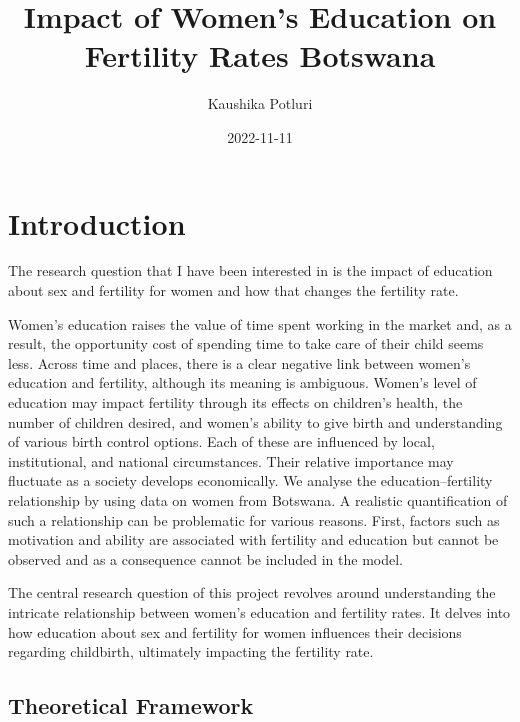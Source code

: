 \documentclass[
  letterpaper,
  DIV=11,
  numbers=noendperiod]{scrartcl}
\title{Impact of Women's Education on Fertility Rates Botswana}
\author{Kaushika Potluri}
\date{2022-11-11}
\begin{document}
\maketitle
\ifdefined\Shaded\renewenvironment{Shaded}{\begin{tcolorbox}[enhanced, frame hidden, breakable, borderline west={3pt}{0pt}{shadecolor}, interior hidden, boxrule=0pt, sharp corners]}{\end{tcolorbox}}\fi

\hypertarget{introduction}{%
\section{Introduction}\label{introduction}}

The research question that I have been interested in is the impact of
education about sex and fertility for women and how that changes the
fertility rate.

Women's education raises the value of time spent working in the market
and, as a result, the opportunity cost of spending time to take care of
their child seems less. Across time and places, there is a clear
negative link between women's education and fertility, although its
meaning is ambiguous. Women's level of education may impact fertility
through its effects on children's health, the number of children
desired, and women's ability to give birth and understanding of various
birth control options. Each of these are influenced by local,
institutional, and national circumstances. Their relative importance may
fluctuate as a society develops economically. We analyse the
education--fertility relationship by using data on women from Botswana.
A realistic quantification of such a relationship can be problematic for
various reasons. First, factors such as motivation and ability are
associated with fertility and education but cannot be observed and as a
consequence cannot be included in the model.

The central research question of this project revolves around
understanding the intricate relationship between women's education and
fertility rates. It delves into how education about sex and fertility
for women influences their decisions regarding childbirth, ultimately
impacting the fertility rate.

\hypertarget{theoretical-framework}{%
\subsection{Theoretical Framework}\label{theoretical-framework}}
\end{document}
